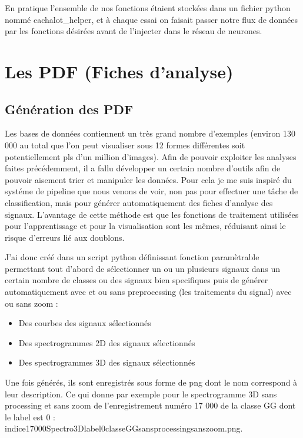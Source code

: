 En pratique l'ensemble de nos fonctions étaient stockées dans un fichier python nommé cachalot\_helper, et à chaque essai on faisait passer notre flux de données par les fonctions désirées avant de l'injecter dans le réseau de neurones.


\hypertarget{Les-PDF}{%
\section{Les PDF (Fiches d'analyse)}
\label{Les-PDF}}

\hypertarget{Guxe9nuxe9ration-des-PDF}{%
\subsection{Génération des PDF}
\label{Guxe9nuxe9ration-des-PDF}}

Les bases de données contiennent un très grand nombre d'exemples (environ 130 000 au total que l'on peut visualiser sous 12 formes différentes soit potentiellement pls d'un million d'images).
Afin de pouvoir exploiter les analyses faites précédemment,  il a fallu développer un certain nombre d'outils afin de pouvoir aisement trier et manipuler les données.
Pour cela je me suis inspiré du systéme de pipeline que nous venons de voir, non pas pour
effectuer une tâche de classification, mais pour générer automatiquement des fiches d'analyse
des signaux.
L'avantage de cette méthode est que les fonctions de traitement utilisées pour l'apprentissage et pour la visualisation sont les mêmes, réduisant ainsi le risque d'erreurs lié aux doublons.

J'ai donc créé dans un script python définissant fonction paramètrable permettant tout d'abord de sélectionner un ou un plusieurs signaux dans un certain nombre de classes ou des signaux bien specifiques puis de générer automatiquement avec et ou sans preprocessing (les traitements du signal) avec ou sans zoom :
\begin{itemize}
\item Des courbes des signaux sélectionnés
\item Des spectrogrammes 2D des signaux sélectionnés
\item Des spectrogrammes 3D des signaux sélectionnés
\end{itemize}
Une fois générés, ils sont enregistrés sous forme de png dont le nom correspond à leur description. Ce qui donne par exemple pour le spectrogramme 3D sans processing et sans zoom de l'enregistrement numéro 17 000 de la classe GG dont le label est 0 :\\
indice17000Spectro3Dlabel0classeGGsansprocessingsanszoom.png.

